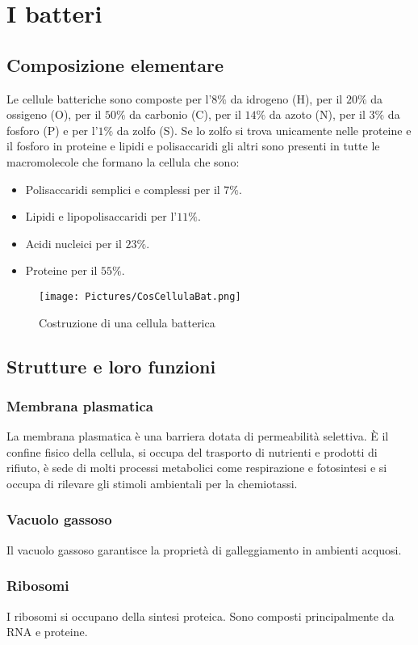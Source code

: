 \section{I batteri}

\subsection{Composizione elementare}
Le cellule batteriche sono composte per l'$8\%$ da idrogeno (H), per il $20\%$ da ossigeno (O), per il $50\%$ da carbonio (C), per il $14\%$ da azoto (N), 
per il $3\%$ da fosforo (P) e per l'$1\%$ da zolfo (S). Se lo zolfo si trova unicamente nelle proteine e il fosforo in proteine e lipidi e polisaccaridi gli
altri sono presenti in tutte le macromolecole che formano la cellula che sono:
\begin{itemize}
\item Polisaccaridi semplici e complessi per il $7\%$.
\item Lipidi e lipopolisaccaridi per l'$11\%$. 
\item Acidi nucleici per il $23\%$.
\item Proteine per il $55\%$.
\end{itemize}
\begin{figure}[H]
\texttt{[image: Pictures/CosCellulaBat.png]}
\caption{Costruzione di una cellula batterica}
\end{figure}
\subsection{Strutture e loro funzioni}
\subsubsection{Membrana plasmatica}
La membrana plasmatica \`e una barriera dotata di permeabilit\`a selettiva. \`E il confine fisico della cellula, si occupa del trasporto di nutrienti e 
prodotti di rifiuto, \`e sede di molti processi metabolici come respirazione e fotosintesi e si occupa di rilevare gli stimoli ambientali per la 
chemiotassi.
\subsubsection{Vacuolo gassoso}
Il vacuolo gassoso garantisce la propriet\`a di galleggiamento in ambienti acquosi.
\subsubsection{Ribosomi}
I ribosomi si occupano della sintesi proteica. Sono composti principalmente da RNA e proteine.
